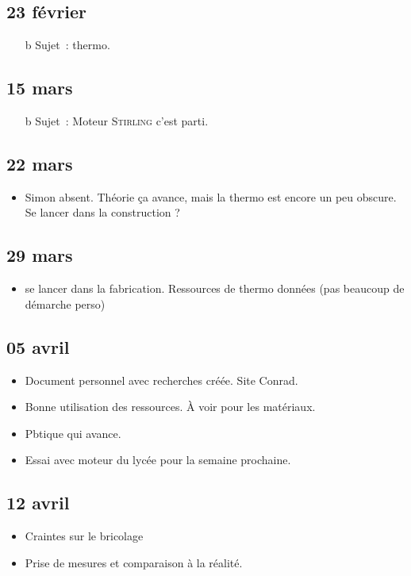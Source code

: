 \documentclass[a4paper, 11pt, final, garamond]{book}
\begin{document}
\subsection{23 février}
\begin{itemize}
	\item[b]{Sujet}~: thermo.
\end{itemize}

\subsection{15 mars}
\begin{itemize}
	\item[b]{Sujet}~: Moteur \textsc{Stirling} c'est parti.
\end{itemize}

\subsection{22 mars}
\begin{itemize}
	\item Simon absent. Théorie ça avance, mais la thermo est encore un peu
	      obscure. Se lancer dans la construction ?
\end{itemize}

\subsection{29 mars}
\begin{itemize}
	\item se lancer dans la fabrication. Ressources de thermo données (pas
	      beaucoup de démarche perso)
\end{itemize}

\subsection{05 avril}
\begin{itemize}
	\item Document personnel avec recherches créée. Site Conrad.
	\item Bonne utilisation des ressources. À voir pour les matériaux.
	\item Pbtique qui avance.
	\item Essai avec moteur du lycée pour la semaine prochaine.
\end{itemize}

\subsection{12 avril}
\begin{itemize}
	\item Craintes sur le bricolage
	\item Prise de mesures et comparaison à la réalité.
\end{itemize}
\end{document}
